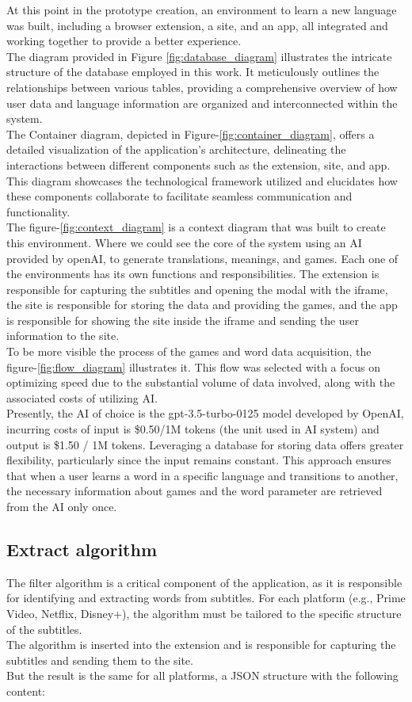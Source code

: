 \documentclass[12pt]{article}
\begin{document}
At this point in the prototype creation, an environment to learn a new language was built, including a browser extension, a site, and an app, all integrated and working together to provide a better experience. \\
The diagram provided in Figure \ref{fig:database_diagram} illustrates the intricate structure of the database employed in this work. It meticulously outlines the relationships between various tables, providing a comprehensive overview of how user data and language information are organized and interconnected within the system. \\
The Container diagram, depicted in Figure-\ref{fig:container_diagram}, offers a detailed visualization of the application's architecture, delineating the interactions between different components such as the extension, site, and app. This diagram showcases the technological framework utilized and elucidates how these components collaborate to facilitate seamless communication and functionality. \\
The figure-\ref{fig:context_diagram} is a context diagram that was built to create this environment. Where we could see the core of the system using an AI provided by openAI, to generate translations, meanings, and games. Each one of the environments has its own functions and responsibilities. The extension is responsible for capturing the subtitles and opening the modal with the iframe, the site is responsible for storing the data and providing the games, and the app is responsible for showing the site inside the iframe and sending the user information to the site. \\
To be more visible the process of the games and word data acquisition, the figure-\ref{fig:flow_diagram} illustrates it. This flow was selected with a focus on optimizing speed due to the substantial volume of data involved, along with the associated costs of utilizing AI. \\
Presently, the AI of choice is the gpt-3.5-turbo-0125 model developed by OpenAI, incurring costs of   input is \$0.50/1M tokens (the unit used in AI system) and output is  \$1.50 / 1M tokens. Leveraging a database for storing data offers greater flexibility, particularly since the input remains constant. This approach ensures that when a user learns a word in a specific language and transitions to another, the necessary information about games and the word parameter are retrieved from the AI only once. 
\newpage
\subsection{Extract algorithm}
The filter algorithm is a critical component of the application, as it is responsible for identifying and extracting words from subtitles. For each platform (e.g., Prime Video, Netflix, Disney+), the algorithm must be tailored to the specific structure of the subtitles. \\
The algorithm is inserted into the extension and is responsible for capturing the subtitles and sending them to the site. \\
But the result is the same for all platforms, a JSON structure with the following content:
\end{document}
